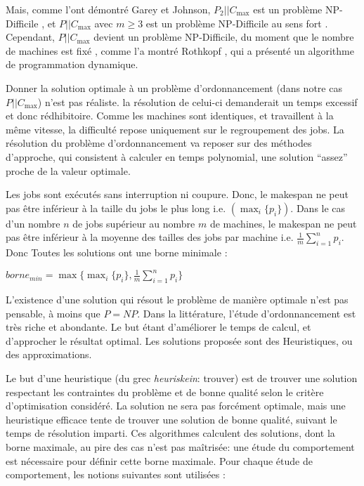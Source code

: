 \documentclass[a4paper,12pt]{report}
\theoremstyle{plain}				%
\theoremstyle{definition}				%
\newcommand\problemGrahamPII{$P_2||C_{\max}$\xspace}	%
\newcommand\problemGrahamP{$P||C_{\max}$\xspace}
\begin{document}
\bigskip
Mais, comme l'ont démontré Garey et Johnson, 
  \problemGrahamPII est un problème NP-Difficile \cite{garey1978strong}, et 
  \problemGrahamP avec $m \geq 3$ est un problème NP-Difficile 
  au sens fort \cite{garey1982computers}. 
Cependant, \problemGrahamP devient un problème NP-Difficile, 
  du moment que le nombre de machines est fixé \cite{chen1999potts}, 
  comme l'a montré Rothkopf \cite{rothkopf1966scheduling}, 
  qui a présenté un algorithme de programmation dynamique.

Donner la solution optimale à un problème d'ordonnancement 
  (dans notre cas \problemGrahamP) n'est pas réaliste. 
  la résolution de celui-ci demanderait un temps excessif et donc rédhibitoire.
Comme les machines sont identiques, et travaillent à la même vitesse,
la difficulté repose uniquement sur le regroupement des jobs.
La résolution du problème d'ordonnancement va reposer sur des méthodes
  d'approche, qui consistent à calculer en temps polynomial,
  une solution ``assez'' proche de la valeur optimale.

Les jobs sont exécutés sans interruption ni coupure. Donc,
  le makespan ne  peut pas être inférieur à la taille du jobs
  le plus long i.e. $(\max_i\{p_i\})$.
  Dans le cas d'un nombre $n$ de jobs supérieur au nombre $m$ de machines,
  le makespan ne peut pas être inférieur à la moyenne
  des tailles des jobs par machine
  i.e. $\frac{1}{m} \sum_{i=1}^{n} p_i$.
Donc Toutes les solutions ont une borne minimale
  \cite{mcnaughton1959scheduling}: \\

  \begin{center}
  $borne_{min} = \max \{ \max_i\{p_i\}, \frac{1}{m} \sum_{i=1}^{n} p_i \}$
  \label{borneMini}
  \end{center}

L'existence d'une solution qui résout le problème de manière optimale
  n'est pas pensable, à moins que $P = NP$.
Dans la littérature, l'étude d'ordonnancement est très riche et abondante. 
Le but étant d'améliorer le temps de calcul, et d'approcher le résultat optimal. 
Les solutions proposée sont des Heuristiques, ou des approximations.

Le but d'une heuristique (du grec \emph{heuriskein}: trouver) est 
  de trouver une solution respectant les contraintes du problème et 
  de bonne qualité selon le critère d'optimisation considéré. 
  La solution ne sera pas forcément optimale, 
  mais une heuristique efficace tente de trouver une solution de bonne qualité, 
  suivant le temps de résolution imparti.
Ces algorithmes calculent des solutions, dont la borne maximale, 
  au pire des cas n'est pas maîtrisée: une étude du comportement est nécessaire 
  pour définir cette borne maximale.  
  Pour chaque étude de comportement, les notions suivantes sont utilisées :
\end{document}
